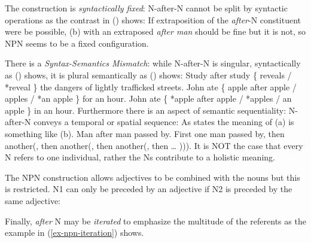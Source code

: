 \documentclass[output=paper]{langsci/langscibook}
\begin{document}
The construction is \emph{syntactically fixed}: N-after-N cannot be split by syntactic operations as the
contrast in () shows:
\eal
{}
\zl
If extraposition of the \emph{after}-N constituent were be possible, (b) with an extraposed
\emph{after man} should be fine but it is not, so NPN seems to be a fixed configuration.

There is a \emph{Syntax-Semantics Mismatch}:
while N-after-N is singular, syntactically as () shows, it is plural semantically as
() shows:
\ea
Study after study \{ reveals / *reveal \} the dangers of lightly trafficked streets.
\z
\eal
\ex John ate \{ apple after apple / apples / *an apple \} for an hour. 
\ex John ate \{ *apple after apple / *apples / an apple \} in an hour.
\zl
Furthermore there is an aspect of semantic sequentiality: N-after-N conveys a temporal or spatial
sequence: As \citet{Bargmann2015a} states the meaning of (a) is something like (b).
\eal
\ex Man after man passed by. 
\ex First one man passed by, then another(, then another(, then another(, then  \ldots{} ))). 
\zl
It is NOT the case that every N refers to one individual, rather the Ns contribute to a holistic meaning.

The NPN construction allows adjectives to be combined with the nouns but this is restricted.
N1 can only be preceded by an adjective if N2 is preceded by the same adjective: 
\eal
{}
\zl

Finally, \emph{after} N may be \emph{iterated} to emphasize the multitude of the referents as the example in (\ref{ex-npn-iteration}) shows. 
\end{document}
